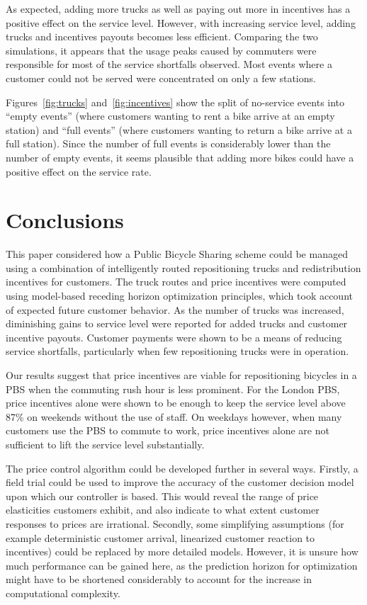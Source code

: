 \documentclass{article}
\begin{document}
As expected, adding more trucks as well as paying out more in incentives has a
positive effect on the service level. However, with increasing service level,
adding trucks and incentives payouts becomes less efficient. Comparing the two
simulations, it appears that the usage peaks caused by commuters were
responsible for most of the service shortfalls observed. Most events where a
customer could not be served were concentrated on only a few
stations.

Figures~\ref{fig:trucks} and~\ref{fig:incentives} show the split of no-service
events into ``empty events'' (where customers wanting to rent a bike arrive at
an empty station) and ``full events'' (where customers wanting to return a bike
arrive at a full station). Since the number of full events is considerably lower
than the number of empty events, it seems plausible that adding more bikes could
have a positive effect on the service rate.

\section{Conclusions}
\label{sec:conclusion}

This paper considered how a Public Bicycle Sharing scheme could be managed using
a combination of intelligently routed repositioning trucks and redistribution
incentives for customers. The truck routes and price incentives were computed
using model-based receding horizon optimization principles, which took account
of expected future customer behavior. As the number of trucks was increased,
diminishing gains to service level were reported for added trucks and customer
incentive payouts. Customer payments were shown to be a means of reducing
service shortfalls, particularly when few repositioning trucks were in
operation.

Our results suggest that price incentives are viable for repositioning bicycles
in a PBS when the commuting rush hour is less prominent. For the London PBS,
price incentives alone were shown to be enough to keep the service level above
87\% on weekends without the use of staff. On weekdays however, when many
customers use the PBS to commute to work, price incentives alone are not
sufficient to lift the service level substantially.

The price control algorithm could be developed further in several ways. Firstly,
a field trial could be used to improve the accuracy of the customer decision
model upon which our controller is based. This would reveal the range of price
elasticities customers exhibit, and also indicate to what extent customer
responses to prices are irrational. Secondly, some simplifying assumptions (for
example deterministic customer arrival, linearized customer reaction to
incentives) could be replaced by more detailed models. However, it is unsure how
much performance can be gained here, as the prediction horizon for optimization
might have to be shortened considerably to account for the increase in
computational complexity.

         
\end{document}

